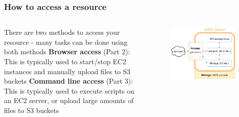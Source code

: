 \documentclass[aspectratio=169]{beamer} %
\begin{document}
\begin{frame}
	\frametitle{How to access a resource}
	
	\begin{columns}[c]
		\large There are two methods to access your resource - many tasks can be done using both methods
		\vspace{.3cm}\newline
		\large \textbf{Browser access} (Part 2): This is typically used to start/stop EC2 instances and manually upload files to S3 buckets
		\vspace{.3cm}\newline
		\large \textbf{Command line access} (Part 3): This is typically used to execute scripts on an EC2 server, or upload large amounts of files to S3 buckets
		
		\begin{figure}
			\centering
			\includegraphics[width=\textwidth]{./img/wb-aws.png}
		\end{figure}
		
	\end{columns}
\end{frame}
\end{document}

